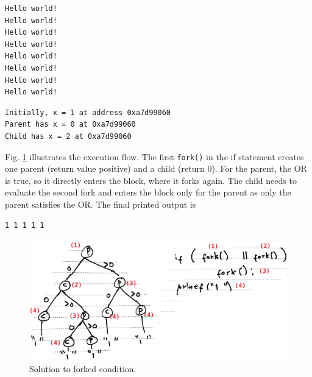 \documentclass[a4paper]{article}
\begin{document}
\begin{exmp}
\textup{

} %
\end{exmp}
\begin{verbatim}
Hello world!
Hello world!
Hello world!
Hello world!
Hello world!
Hello world!
Hello world!
Hello world!
\end{verbatim}


\begin{exmp}
\textup{

} %
\end{exmp}
\begin{verbatim}
Initially, x = 1 at address 0xa7d99060
Parent has x = 0 at 0xa7d99060
Child has x = 2 at 0xa7d99060
\end{verbatim}


\begin{exmp}
\textup{

} %
\end{exmp}

Fig. \ref{fig:fork_tree_sol} illustrates the execution flow. The first \texttt{fork()} in the if statement creates one parent (return value positive) and a child (return 0). For the parent, the OR is true, so it directly enters the block, where it forks again. The child needs to evaluate the second fork and enters the block only for the parent as only the parent satisfies the OR. The final printed output is
\begin{verbatim}
1 1 1 1 1
\end{verbatim}
\begin{figure}[H]
    \centering
    \includegraphics[height=5.25cm]{img/fork_tree_sol.png}
    \caption{Solution to forked condition.}
    \label{fig:fork_tree_sol}
\end{figure}
\end{document}
